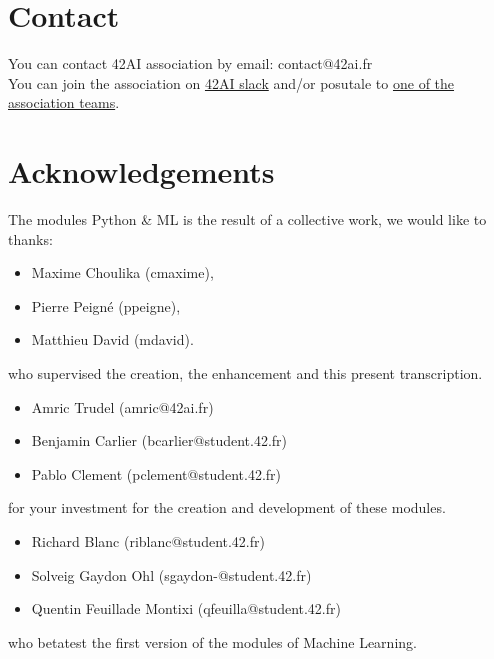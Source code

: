 \documentclass{42-en}
\begin{document}

\newpage

\section*{Contact}
You can contact 42AI association by email: contact@42ai.fr\\
You can join the association on \href{https://join.slack.com/t/42-ai/shared_invite/zt-ebccw5r7-YPkDM6xOiYRPjqJXkrKgcA}{42AI slack}
and/or posutale to \href{https://forms.gle/VAFuREWaLmaqZw2D8}{one of the association teams}.

\section*{Acknowledgements}
The modules Python \& ML is the result of a collective work, we would like to thanks:
\begin{itemize}
  \item Maxime Choulika (cmaxime),
  \item Pierre Peigné (ppeigne),
  \item Matthieu David (mdavid).
\end{itemize}
who supervised the creation, the enhancement and this present transcription.

\begin{itemize}
  \item Amric Trudel (amric@42ai.fr)
  \item Benjamin Carlier (bcarlier@student.42.fr)
  \item Pablo Clement (pclement@student.42.fr)
\end{itemize}
for your investment for the creation and development of these modules.

\begin{itemize}
  \item Richard Blanc (riblanc@student.42.fr)
  \item Solveig Gaydon Ohl (sgaydon-@student.42.fr)
  \item Quentin Feuillade Montixi (qfeuilla@student.42.fr)
\end{itemize}
who betatest the first version of the modules of Machine Learning.
\vfill
\doclicenseThis
\end{document}
